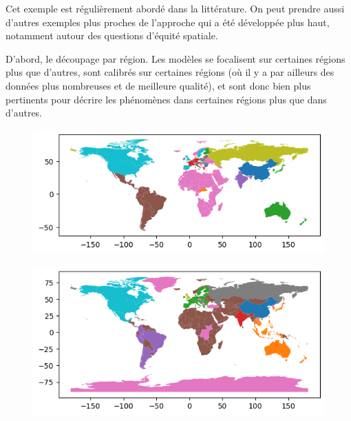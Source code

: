 Cet exemple est régulièrement abordé dans la littérature. On peut prendre aussi d'autres exemples plus proches de l'approche qui a été développée plus haut, notamment autour des questions d'équité spatiale. 

D'abord, le découpage par région. Les modèles se focalisent sur certaines régions plus que d'autres, sont calibrés sur certaines régions (où il y a par ailleurs des données plus nombreuses et de meilleure qualité), et sont donc bien plus pertinents pour décrire les phénomènes dans certaines régions plus que dans d'autres.  

\begin{figure}[htbp]
    \centering
    \begin{minipage}{0.45\textwidth}
        \centering
        \includegraphics[width=\linewidth]{figures/FUND_regions.png} %
        \label{fig:carte1}
    \end{minipage}%
    \hfill
    \begin{minipage}{0.45\textwidth}
        \centering
        \includegraphics[width=\linewidth]{figures/WILIAM_regions.png} %
        \label{fig:carte2}
    \end{minipage}%
    \label{fig:trois_cartes}
\end{figure} 

